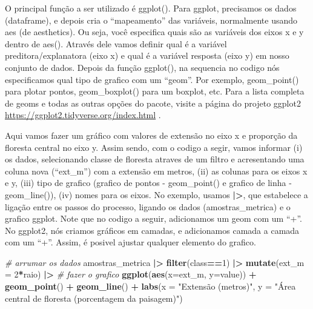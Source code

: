\documentclass[
]{article}
\newenvironment{Shaded}{\begin{snugshade}}{\end{snugshade}}
\newcommand{\AttributeTok}[1]{\textcolor[rgb]{0.13,0.29,0.53}{#1}}
\newcommand{\CommentTok}[1]{\textcolor[rgb]{0.56,0.35,0.01}{\textit{#1}}}
\newcommand{\DecValTok}[1]{\textcolor[rgb]{0.00,0.00,0.81}{#1}}
\newcommand{\FunctionTok}[1]{\textcolor[rgb]{0.13,0.29,0.53}{\textbf{#1}}}
\newcommand{\NormalTok}[1]{#1}
\newcommand{\SpecialCharTok}[1]{\textcolor[rgb]{0.81,0.36,0.00}{\textbf{#1}}}
\newcommand{\StringTok}[1]{\textcolor[rgb]{0.31,0.60,0.02}{#1}}
\begin{document}
\newpage

O principal função a ser utilizado é \colorbox[HTML]{dedede}{ggplot()}.
Para ggplot, precisamos os dados (dataframe), e depois cria o ``mapeamento'' das variáveis, normalmente usando \colorbox[HTML]{dedede}{aes} (de aesthetics). Ou seja, você especifica quais são as variáveis dos eixos x e y dentro de \colorbox[HTML]{dedede}{aes()}. Através dele vamos definir qual é a variável preditora/explanatora (eixo x) e qual é a variável resposta (eixo y) em nosso conjunto de dados.
Depois da função \colorbox[HTML]{dedede}{ggplot()}, na sequencia no codigo nós especificamos qual tipo de grafico com um ``geom''. Por exemplo, \colorbox[HTML]{dedede}{geom\_point()} para plotar pontos, \colorbox[HTML]{dedede}{geom\_boxplot()} para um boxplot, etc. Para a lista completa de geoms e todas as outras opções do pacote, visite a página do projeto ggplot2 \url{https://ggplot2.tidyverse.org/index.html} .

Aqui vamos fazer um gráfico com valores de extensão no eixo x e proporção da floresta central no eixo y.
Assim sendo, com o codigo a segir, vamos informar (i) os dados, selecionando classe de floresta atraves de um filtro e acresentando uma coluna nova (``ext\_m'') com a extensão em metros, (ii) as colunas para os eixos x e y, (iii) tipo de grafico (grafico de pontos - \colorbox[HTML]{dedede}{geom\_point()} e grafico de linha - \colorbox[HTML]{dedede}{geom\_line()}), (iv) nomes para os eixos. No exemplo, usamos \textbf{|>}, que estabelece a ligação entre os passos do processo, ligando os dados (amostras\_metrica) e o grafico \colorbox[HTML]{dedede}{ggplot}. Note que no codigo a seguir, adicionamos um geom com um ``+''. No ggplot2, nós criamos gráficos em camadas, e adicionamos camada a camada com um ``+''. Assim, é posivel ajustar qualquer elemento do grafico.

\begin{Shaded}
\begin{Highlighting}[]
\CommentTok{\# arrumar os dados}
\NormalTok{amostras\_metrica }\SpecialCharTok{|\textgreater{}} 
  \FunctionTok{filter}\NormalTok{(class}\SpecialCharTok{==}\DecValTok{1}\NormalTok{) }\SpecialCharTok{|\textgreater{}} \FunctionTok{mutate}\NormalTok{(}\AttributeTok{ext\_m =} \DecValTok{2}\SpecialCharTok{*}\NormalTok{raio) }\SpecialCharTok{|\textgreater{}}
\CommentTok{\# fazer o grafico}
  \FunctionTok{ggplot}\NormalTok{(}\FunctionTok{aes}\NormalTok{(}\AttributeTok{x=}\NormalTok{ext\_m, }\AttributeTok{y=}\NormalTok{value)) }\SpecialCharTok{+} 
  \FunctionTok{geom\_point}\NormalTok{() }\SpecialCharTok{+}  \FunctionTok{geom\_line}\NormalTok{() }\SpecialCharTok{+}
  \FunctionTok{labs}\NormalTok{(}\AttributeTok{x =} \StringTok{"Extensão (metros)"}\NormalTok{, }
       \AttributeTok{y =} \StringTok{"Área central de floresta (porcentagem da paisagem)"}\NormalTok{)}
\end{Highlighting}
\end{Shaded}
\end{document}
